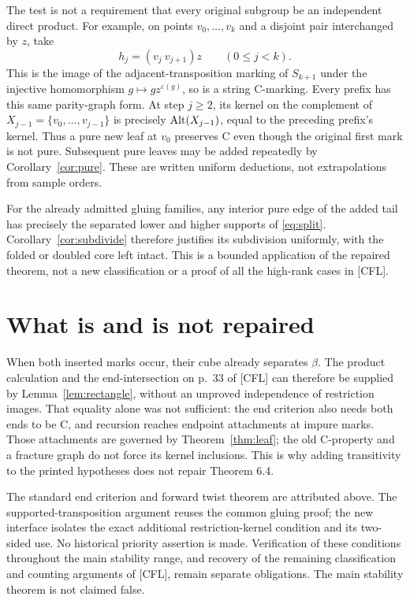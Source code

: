 \documentclass[a4paper,11pt]{article}
\begin{document}
The test is not a requirement that every original subgroup be an independent
direct product. For example, on points $v_0,\ldots,v_k$ and a disjoint
pair interchanged by $z$, take
\[
 h_j=(v_j\ v_{j+1})z\qquad(0\leq j<k).
\]
This is the image of the adjacent-transposition marking of $S_{k+1}$
under the injective homomorphism $g\mapsto g z^{\varepsilon(g)}$,
so is a string C-marking. Every prefix has this same parity-graph form.
At step $j\geq2$, its kernel on the complement of
$X_{j-1}=\{v_0,\ldots,v_{j-1}\}$ is precisely $\operatorname{Alt}(X_{j-1})$,
equal to the preceding prefix's kernel. Thus a pure new leaf at $v_0$
preserves C even though the original first mark is not pure. Subsequent
pure leaves may be added repeatedly by Corollary~\ref{cor:pure}.
These are written uniform deductions, not extrapolations from sample orders.

For the already admitted gluing families, any interior pure edge of the
added tail has precisely the separated lower and higher supports of
\eqref{eq:split}. Corollary~\ref{cor:subdivide} therefore justifies its
subdivision uniformly, with the folded or doubled core left intact.
This is a bounded application of the repaired theorem, not a new
classification or a proof of all the high-rank cases in [CFL].

\section{What is and is not repaired}
When both inserted marks occur, their cube already separates $\beta$.
The product calculation and the end-intersection on p.~33 of [CFL]
can therefore be supplied by Lemma~\ref{lem:rectangle}, without an
unproved independence of restriction images. That equality alone was
not sufficient: the end criterion also needs both ends to be C, and
recursion reaches endpoint attachments at impure marks. Those attachments
are governed by Theorem~\ref{thm:leaf}; the old C-property and a
fracture graph do not force its kernel inclusions. This is why adding
transitivity to the printed hypotheses does not repair Theorem 6.4.

The standard end criterion and forward twist theorem are attributed above.
The supported-transposition argument reuses the common gluing proof; the
new interface isolates the exact additional restriction-kernel condition
and its two-sided use. No historical priority assertion is made.
Verification of these conditions throughout the main stability range,
and recovery of the remaining classification and counting arguments of
[CFL], remain separate obligations. The main stability theorem is not
claimed false.
\end{document}
